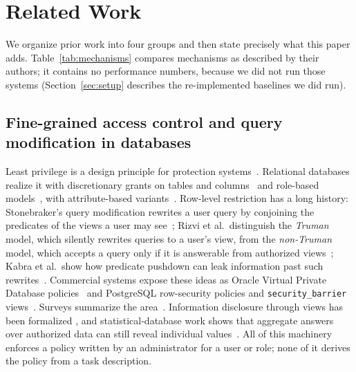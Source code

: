 \section{Related Work}
\label{sec:related}

We organize prior work into four groups and then state precisely what this paper adds.
Table~\ref{tab:mechanisms} compares mechanisms as described by their authors; it contains no
performance numbers, because we did not run those systems (Section~\ref{sec:setup} describes the
re-implemented baselines we did run).

\subsection{Fine-grained access control and query modification in databases}
Least privilege is a design principle for protection systems~\cite{saltzer1975protection}.
Relational databases realize it with discretionary grants on tables and
columns~\cite{griffiths1976authorization} and role-based models~\cite{sandhu1996rbac,ferraiolo2001nist},
with attribute-based variants~\cite{hu2014abac}. Row-level restriction has a long history:
Stonebraker's query modification rewrites a user query by conjoining the predicates of the views a
user may see~\cite{stonebraker1975query}; Rizvi et al.\ distinguish the \emph{Truman} model, which
silently rewrites queries to a user's view, from the \emph{non-Truman} model, which accepts a query only
if it is answerable from authorized views~\cite{rizvi2004extending}; Kabra et al.\ show how predicate
pushdown can leak information past such rewrites~\cite{kabra2006redundancy}. Commercial systems expose
these ideas as Oracle Virtual Private Database policies~\cite{oraclevpd} and PostgreSQL row-security
policies and \texttt{security\_barrier} views~\cite{pgrls,pgsecbarrier}. Surveys summarize the
area~\cite{bertino2005database}. Information disclosure through views has been formalized
\cite{miklau2004formal}, and statistical-database work shows that aggregate answers over authorized data
can still reveal individual values~\cite{denning1979tracker,adam1989security}. All of this machinery
enforces a policy written by an administrator for a user or role; none of it derives the policy from a
task description.

